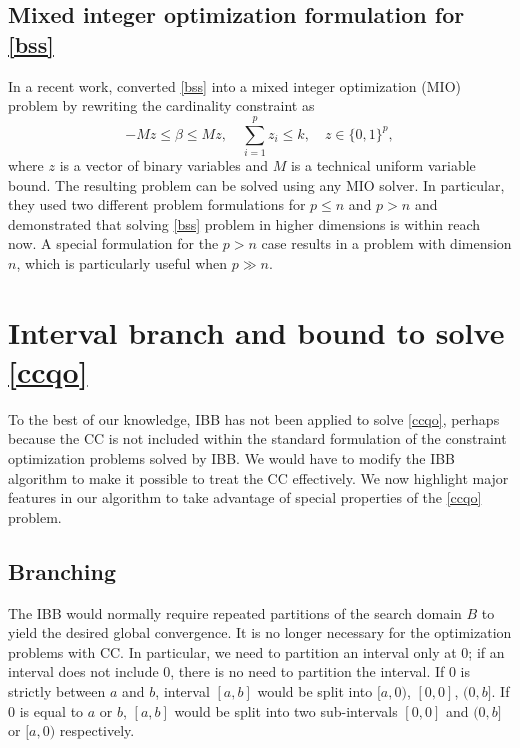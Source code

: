 \documentclass[10pt, letterpaper]{article}
\begin{document}
\subsection{Mixed integer optimization formulation for \eqref{bss}}
In a recent work, \cite{bertsimasEtal:2015} converted  \eqref{bss} into a mixed integer optimization (MIO) problem by rewriting the cardinality constraint as
\[ -Mz\leq \beta \leq Mz, \quad  
  \sum_{i=1}^{p} z_{i} \leq k, \quad 
   z \in \{0,1\}^{p}, \]  
where $z$ is a vector of binary variables and $M$ is a technical uniform variable bound. The resulting problem can be solved using any MIO solver. In particular, they used two different problem formulations for $p\leq n$ and $p>n$ and demonstrated that solving \eqref{bss} problem in higher dimensions is within reach now. A special formulation for the $p>n$ case results in a problem with dimension $n$, which is particularly useful when $p \gg n$.
\section{Interval branch and bound to solve \eqref{ccqo}}
\label{sec:bss-using-ivlbb}
To the best of our knowledge, IBB has not been applied to solve \eqref{ccqo}, perhaps because the CC is not included within the standard formulation of the constraint optimization problems solved by IBB. %
We would have to modify the IBB algorithm to make it possible to treat the CC effectively. 
We now highlight major features in our algorithm to take advantage of special properties of the \eqref{ccqo} problem.
\subsection{Branching} 
The IBB would normally require repeated partitions of the search domain $B$ to yield the desired global convergence. It is no longer necessary for the optimization problems with CC. In particular, we need to partition an interval only at $0$; if an interval does not include $0$, there is no need to partition the interval. If $0$ is strictly between $a$ and $b$, interval $[a, b]$ would be split into $[a, 0)$, $[0, 0]$, $(0, b]$.  If $0$ is equal to $a$ or $b$, $[a, b]$ would be split into two sub-intervals $[0,0]$ and $(0,b]$ or $[a,0)$ respectively. 
\end{document}
